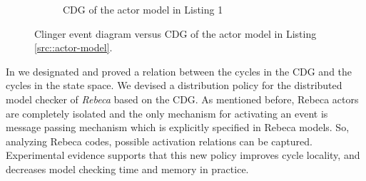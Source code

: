 \begin{figure}
\begin{subfigure}[b]{0.2\textwidth}
{  }
  \caption{CDG of the actor model in Listing 1}
\end{subfigure}
\caption{Clinger event diagram versus CDG of the actor model in Listing \ref{src::actor-model}.}
\label{fig::clinger-cdg}
\end{figure}

In \cite{DBLP:journals/eceasst/KhamespanahSMSR15} we designated and proved a relation between the cycles in the CDG and the cycles in the state space. We devised a distribution policy for the distributed model checker of \emph{Rebeca} based on the CDG. As mentioned before, Rebeca actors are completely isolated and the only mechanism for activating an event is message passing mechanism which is explicitly specified in Rebeca models. So, analyzing Rebeca codes, possible activation relations can be captured. Experimental evidence supports that this new policy improves cycle locality, and decreases model checking time and memory in practice.